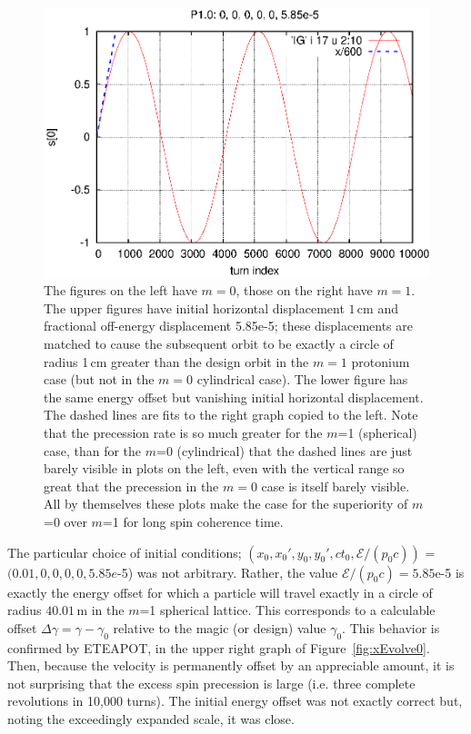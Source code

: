 \documentclass[]{article}
\begin{document}
\begin{figure}[h]
\includegraphics[scale=0.6]{eps/SpinEvolve17.P1.0.eps}
\caption{\label{fig:SpinEvolve0.17}The figures on the left have 
$m=0$, those on the right have $m=1$. The upper figures
have initial horizontal displacement $1\,$cm and fractional
off-energy displacement 5.85e-5; these displacements are 
matched to cause the subsequent orbit to be exactly a circle 
of radius 1\,cm greater than the design orbit in the $m=1$
protonium case (but not in the $m=0$ cylindrical case). 
The lower figure
has the same energy offset but vanishing initial horizontal
displacement. The dashed lines are fits to
the right graph copied to the left. Note that the precession
rate is so much greater for the $m$=1 (spherical) case,
than for the $m$=0 (cylindrical) that the dashed lines
are just barely visible in plots on the left, even with
the vertical range so great that the precession in the
$m=0$ case is itself barely visible. All by themselves these
plots make the case for the superiority of $m$=0 over $m$=1 for
long spin coherence time.
}
\end{figure}
%

\clearpage

The particular choice of initial conditions;
$(x_0, x_0', y_0, y_0', ct_0, \mathcal{E}/(p_0c))$ = 
$(0.01, 0, 0, 0, 0, 5.85e$-5)
was not arbitrary. Rather, the value $\mathcal{E}/(p_0c)=5.85$e-5
is exactly the energy offset for which a particle will travel exactly 
in a circle of radius $40.01\,$m in the $m$=1 spherical lattice. 
This corresponds to a calculable offset $\Delta\gamma=\gamma-\gamma_0$ 
relative to the magic (or design) value $\gamma_0$. 
This behavior is confirmed by ETEAPOT, in the upper right graph of
Figure~\ref{fig:xEvolve0}. Then, because the velocity 
is permanently offset by an appreciable amount, it is not surprising 
that the excess spin precession is large 
(i.e. three complete revolutions in 10,000 turns).
The initial energy offset was not exactly correct but, noting the
exceedingly expanded scale, it was close.
\end{document}
